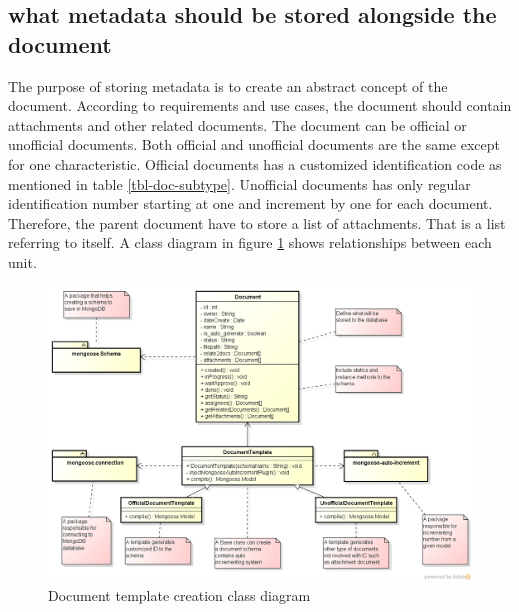 \subsection{what metadata should be stored alongside the document}
The purpose of storing metadata is to create an abstract concept of the document.
According to requirements and use cases, the document should contain attachments and other related documents.
The document can be official or unofficial documents.
Both official and unofficial documents are the same except for one characteristic.
Official documents has a customized identification code as mentioned in table \ref{tbl-doc-subtype}.
Unofficial documents has only regular identification number starting at one and increment by one for each document.
Therefore, the parent document have to store a list of attachments.
That is a list referring to itself.
A class diagram in figure \ref{fig:doc-template} shows relationships between each unit.

\begin{figure}
	\caption{Document template creation class diagram}
	\label{fig:doc-template}
	\includegraphics[scale=0.5]{res/software-design/document_templating}
\end{figure}

